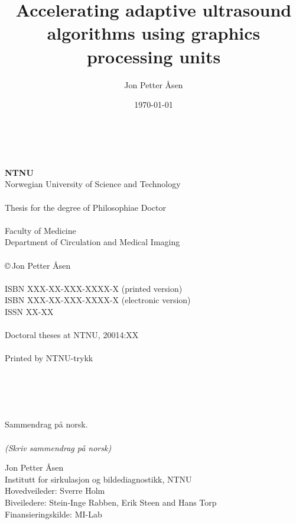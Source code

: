 \documentclass[10pt,b5paper,twoside]{book}
\author{Jon Petter \AA{}sen}
\title{%
Accelerating adaptive ultrasound algorithms using graphics processing units 
\vspace{0.5cm}}
\newcommand\todo[1]{{\textit{\color{red}(#1)}}}
\begin{document}
\date{\today}
\pagestyle{empty} \maketitle

\newpage%

\renewcommand{\thepage}{\roman{page}}%

~\\
\vspace{10.0cm}
~\\
{\bf NTNU}
\\
Norwegian University of Science and Technology\\
\\
Thesis for the degree of Philosophiae Doctor\\
\\
Faculty of Medicine\\
Department of Circulation and Medical Imaging\\
\\
\copyright\,Jon Petter \AA{}sen\\
\\
ISBN XXX-XX-XXX-XXXX-X (printed version)\\
ISBN XXX-XX-XXX-XXXX-X (electronic version)\\
ISSN XX-XX\\
\\
Doctoral theses at NTNU, 20014:XX\\
\\
Printed by NTNU-trykk

~\\
\newpage
~\\%
~\\%
~\\
\noindent\large 
Sammendrag p\aa{} norsk.
\\\\%
\normalsize
\todo{Skriv sammendrag p\aa{} norsk}

\vspace{0.3cm}
\noindent Jon Petter \AA{}sen\\
Institutt for sirkulasjon og bildediagnostikk, NTNU\\
Hovedveileder: Sverre Holm\\ 
Biveiledere: Stein-Inge Rabben, Erik Steen and Hans Torp\\
Finansieringskilde: MI-Lab
\end{document}
